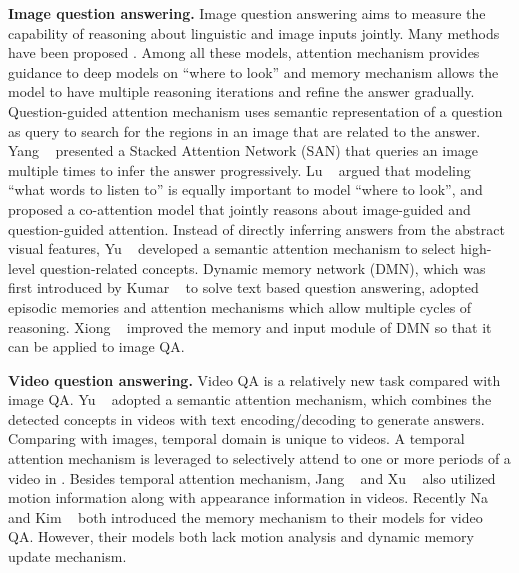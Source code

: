 \documentclass[10pt,twocolumn,letterpaper]{article}
\begin{document}
\textbf{Image question answering.} 
Image question answering aims to measure the capability of reasoning about linguistic and image inputs jointly. Many methods have been proposed \cite{san_Yang_2016_CVPR, chen2015abc_cnn, fda_ilievski2016focused, hie_coatten_lu2016hierarchical, xu2016ask, fukui2016multimodal, Antol_2015_ICCV, Andreas_2016_CVPR, xiong2016dynamic, Malinowski_2015_ICCV, Kanchen_2018_CVPR, shih2016look, kim2016multimodal, Hu_2017_ICCV, ZhuChen_2017_ICCV, yu2017multi, Yuke_2017_ICCV, zhu2016visual7w}. 
Among all these models, attention mechanism \cite{san_Yang_2016_CVPR, chen2015abc_cnn, hie_coatten_lu2016hierarchical, zhu2016visual7w} provides guidance to deep models on ``where to look'' and  memory mechanism \cite{kumar2016ask, xiong2016dynamic} allows the model to have multiple reasoning iterations and refine the answer gradually. 
Question-guided attention mechanism \cite{chen2015abc_cnn} uses semantic representation of a question as query to search for the regions in an image that are related to the answer. Yang \etal~\cite{san_Yang_2016_CVPR} presented a Stacked Attention Network (SAN) that queries an image multiple times to infer the answer progressively. 
Lu \etal~\cite{hie_coatten_lu2016hierarchical} argued that modeling ``what words to listen to'' is equally important to model ``where to look'', and proposed a co-attention model that jointly reasons about image-guided and question-guided attention. Instead of directly inferring answers from the abstract visual features, Yu \etal~\cite{yu2017multi} developed a semantic attention mechanism to select high-level question-related concepts. Dynamic memory network (DMN), which was first introduced by Kumar \etal~\cite{kumar2016ask} to solve text based question answering, adopted episodic memories and attention mechanisms which allow multiple cycles of reasoning. Xiong \etal~\cite{xiong2016dynamic} improved the memory and input module of DMN so that it can be applied to image QA.

\textbf{Video question answering.} Video QA is a relatively new task compared with image QA.
Yu \etal~\cite{Yu_2017_CVPR} adopted a semantic attention mechanism, which combines the detected concepts in videos with text
encoding/decoding to generate answers.
Comparing with images, temporal domain is unique to videos. A temporal attention mechanism is leveraged to selectively attend to one or more periods of a video in \cite{Jang_2017_CVPR, Mun_2017_ICCV, xu_2017_video}.
Besides temporal attention mechanism, Jang \etal~\cite{Jang_2017_CVPR} and Xu \etal~\cite{xu_2017_video} also utilized motion information along with appearance information in videos. 
Recently Na \etal~\cite{Na_2017_ICCV} and Kim \etal~\cite{kim_2017_deepstory} both introduced the memory mechanism to their models for video QA. However, their models \cite{Na_2017_ICCV, kim_2017_deepstory} both lack motion analysis and dynamic memory update mechanism. 
\end{document}
